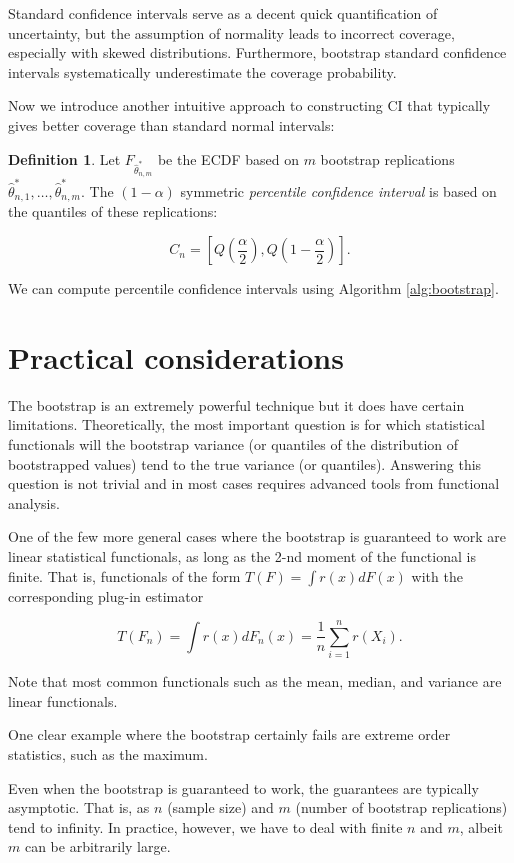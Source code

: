 \documentclass{book}
\theoremstyle{plain}%
\theoremstyle{definition}
\newtheorem{definition}{Definition}[section]
\begin{document}
Standard confidence intervals serve as a decent quick quantification of uncertainty, but the assumption of normality leads to incorrect coverage, especially with skewed distributions. Furthermore, bootstrap standard confidence intervals systematically underestimate the coverage probability.

Now we introduce another intuitive approach to constructing CI that typically gives better coverage than standard normal intervals:

\begin{definition} Let $F_{\hat{\theta}^*_{n,m}}$ be the ECDF based on $m$ bootstrap replications $\hat{\theta}^*_{n,1},\dots, \hat{\theta}^*_{n,m}$. The $(1 - \alpha)$ symmetric \emph{percentile confidence interval} is based on the quantiles of these replications:

$$C_n = [Q(\frac{\alpha}{2}),Q(1-\frac{\alpha}{2})].$$
\end{definition}

We can compute percentile confidence intervals using Algorithm \ref{alg:bootstrap}.

\section{Practical considerations}

The bootstrap is an extremely powerful technique but it does have certain limitations. Theoretically, the most important question is for which statistical functionals will the bootstrap variance (or quantiles of the distribution of bootstrapped values) tend to the true variance (or quantiles). Answering this question is not trivial and in most cases requires advanced tools from functional analysis.

One of the few more general cases where the bootstrap is guaranteed to work are linear statistical functionals, as long as the 2-nd moment of the functional is finite. That is, functionals of the form $T(F) = \int r(x) dF(x)$ with the corresponding plug-in estimator

$$T(F_n) = \int r(x)dF_n(x) = \frac{1}{n}\sum_{i=1}^n r(X_i).$$ 

Note that most common functionals such as the mean, median, and variance are linear functionals.

One clear example where the bootstrap certainly fails are extreme order statistics, such as the maximum.

Even when the bootstrap is guaranteed to work, the guarantees are typically asymptotic. That is, as $n$ (sample size) and $m$ (number of bootstrap replications) tend to infinity. In practice, however, we have to deal with finite $n$ and $m$, albeit $m$ can be arbitrarily large.
\end{document}

